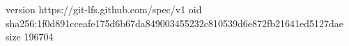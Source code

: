 version https://git-lfs.github.com/spec/v1
oid sha256:1f0d891cceafe175d6b67da849003455232c810539d6e872fb21641ed5127dae
size 196704
